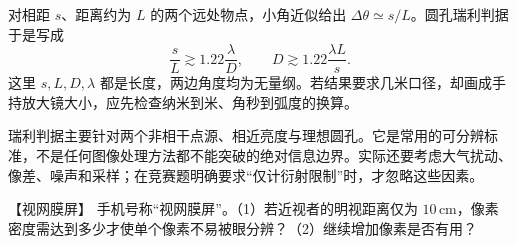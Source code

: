 对相距 $s$、距离约为 $L$ 的两个远处物点，小角近似给出 $\Delta\theta\simeq s/L$。圆孔瑞利判据于是写成
\[
 \frac{s}{L}\gtrsim1.22\frac{\lambda}{D},
 \qquad D\gtrsim1.22\frac{\lambda L}{s}.
\]
这里 $s,L,D,\lambda$ 都是长度，两边角度均为无量纲。若结果要求几米口径，却画成手持放大镜大小，应先检查纳米到米、角秒到弧度的换算。

瑞利判据主要针对两个非相干点源、相近亮度与理想圆孔。它是常用的可分辨标准，不是任何图像处理方法都不能突破的绝对信息边界。实际还要考虑大气扰动、像差、噪声和采样；在竞赛题明确要求“仅计衍射限制”时，才忽略这些因素。

\begin{origexamplebox}{【视网膜屏】}\label{ch30:ex:s45-22-1}
手机号称“视网膜屏”。（1）若近视者的明视距离仅为 $10\,\mathrm{cm}$，像素密度需达到多少才使单个像素不易被眼分辨？（2）继续增加像素是否有用？

\begin{center}\begin{minipage}{.96\linewidth}\centering
{}
\end{minipage}\end{center}
\end{origexamplebox}\par\nopagebreak[3]
